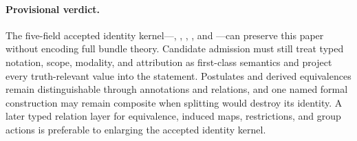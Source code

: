 \paragraph{Provisional verdict.}
\begin{sloppypar}
The five-field accepted identity kernel---, , , , and ---can preserve this paper without encoding full bundle theory. Candidate admission must still treat typed notation, scope, modality, and attribution as first-class semantics and project every truth-relevant value into the statement. Postulates and derived equivalences remain distinguishable through annotations and relations, and one named formal construction may remain composite when splitting would destroy its identity. A later typed relation layer for equivalence, induced maps, restrictions, and group actions is preferable to enlarging the accepted identity kernel.
\end{sloppypar}